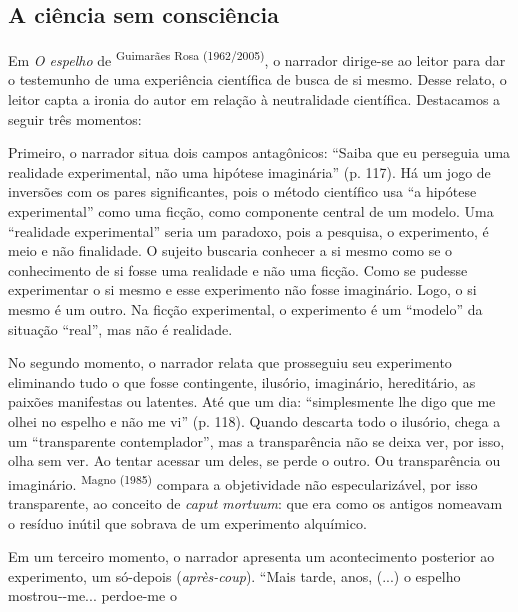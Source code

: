 \begin{multicols}{2}
\section*{A ciência sem consciência}
\par{}Em \textit{O espelho} de \textsuperscript{Guimarães Rosa (\allowbreak{}1962\fshyp{}2005)\allowbreak{}},\allowbreak{} o narrador dirige-\allowbreak{}se ao leitor para dar o testemunho de uma experiência científica de busca de si mesmo.\allowbreak{} Desse relato,\allowbreak{} o leitor capta a ironia do autor em relação à neutralidade científica.\allowbreak{} Destacamos a seguir três momentos:\allowbreak{}\par{}Primeiro,\allowbreak{} o narrador situa dois campos antagônicos:\allowbreak{} “Saiba que eu perseguia uma realidade experimental,\allowbreak{} não uma hipótese imaginária” (\allowbreak{}p.\allowbreak{} 117)\allowbreak{}.\allowbreak{} Há um jogo de inversões com os pares significantes,\allowbreak{} pois o método científico usa “a hipótese experimental” como uma ficção,\allowbreak{} como componente central de um modelo.\allowbreak{} Uma “realidade experimental” seria um paradoxo,\allowbreak{} pois a pesquisa,\allowbreak{} o experimento,\allowbreak{} é meio e não finalidade.\allowbreak{} O sujeito buscaria conhecer a si mesmo como se o conhecimento de si fosse uma realidade e não uma ficção.\allowbreak{} Como se pudesse experimentar o si mesmo e esse experimento não fosse imaginário.\allowbreak{} Logo,\allowbreak{} o si mesmo é um outro.\allowbreak{} Na ficção experimental,\allowbreak{} o experimento é um “modelo” da situação “real”,\allowbreak{} mas não é realidade.\allowbreak{}\par{}No segundo momento,\allowbreak{} o narrador relata que prosseguiu seu experimento eliminando tudo o que fosse contingente,\allowbreak{} ilusório,\allowbreak{} imaginário,\allowbreak{} hereditário,\allowbreak{} as paixões manifestas ou latentes.\allowbreak{} Até que um dia:\allowbreak{} “simplesmente lhe digo que me olhei no espelho e não me vi” (\allowbreak{}p.\allowbreak{} 118)\allowbreak{}.\allowbreak{} Quando descarta todo o ilusório,\allowbreak{} chega a um “transparente contemplador”,\allowbreak{} mas a transparência não se deixa ver,\allowbreak{} por isso,\allowbreak{} olha sem ver.\allowbreak{} Ao tentar acessar um deles,\allowbreak{} se perde o outro.\allowbreak{} Ou transparência ou imaginário.\allowbreak{} \textsuperscript{Magno (\allowbreak{}1985)\allowbreak{}} compara a objetividade não especularizável,\allowbreak{} por isso transparente,\allowbreak{} ao conceito de \textit{caput mortuum}:\allowbreak{} que era como os antigos nomeavam o resíduo inútil que sobrava de um experimento alquímico.\allowbreak{}\par{}Em um terceiro momento,\allowbreak{} o narrador apresenta um acontecimento posterior ao experimento,\allowbreak{} um só-\allowbreak{}depois (\allowbreak{}\textit{après-\allowbreak{}coup})\allowbreak{}.\allowbreak{} “Mais tarde,\allowbreak{} anos,\allowbreak{} (\allowbreak{}.\allowbreak{}.\allowbreak{}.\allowbreak{})\allowbreak{} o espelho mostrou-\allowbreak{}-\allowbreak{}me.\allowbreak{}.\allowbreak{}.\allowbreak{} perdoe-\allowbreak{}me o 
\end{multicols}
